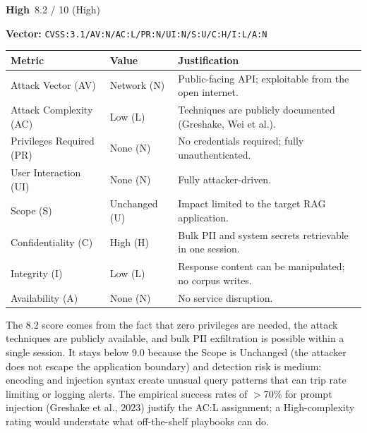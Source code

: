 \documentclass[12pt,a4paper]{report}
\newcommand{\badgehigh}{\colorbox{gray!15}{\footnotesize\textbf{High}}}
\newcommand{\cvssvec}[1]{\texttt{\small #1}}
\begin{document}
\begin{cvssbox}{\badgehigh\ 8.2 / 10 (High)}
\vspace{2pt}
\begin{center}
\textbf{Vector:}\enspace
\cvssvec{CVSS:3.1/AV:N/AC:L/PR:N/UI:N/S:U/C:H/I:L/A:N}
\end{center}
\vspace{8pt}
\begin{tabular}{W{3.4cm}W{2.2cm}W{7.8cm}}
\toprule
  
  \small\textbf{Metric} &
  \small\textbf{Value} &
  \small\textbf{Justification} \\
  \midrule
  
  \small Attack Vector (AV)     & \small Network (N) & \small Public-facing API; exploitable from the open internet. \\
  
  \small Attack Complexity (AC) & \small Low (L)     & \small Techniques are publicly documented (Greshake, Wei et al.). \\
  
  \small Privileges Required (PR)  & \small None (N) & \small No credentials required; fully unauthenticated. \\
  
  \small User Interaction (UI)  & \small None (N)    & \small Fully attacker-driven. \\
  
  \small Scope (S)              & \small Unchanged (U) & \small Impact limited to the target RAG application. \\
  
  \small Confidentiality (C)    & \small High (H)    & \small Bulk PII and system secrets retrievable in one session. \\
  
  \small Integrity (I)          & \small Low (L)     & \small Response content can be manipulated; no corpus writes. \\
  
  \small Availability (A)       & \small None (N)    & \small No service disruption. \\
  \bottomrule
\end{tabular}
\vspace{6pt}

\small The 8.2 score comes from the fact that zero privileges are needed,
the attack techniques are publicly available, and bulk PII exfiltration is
possible within a single session. It stays below 9.0 because the Scope is
Unchanged (the attacker does not escape the application boundary) and
detection risk is medium: encoding and injection syntax create unusual
query patterns that can trip rate limiting or logging alerts. The empirical
success rates of $>70\%$ for prompt injection (Greshake et al., 2023)
justify the AC:L assignment; a High-complexity rating would understate
what off-the-shelf playbooks can do.
\end{cvssbox}
\end{document}
